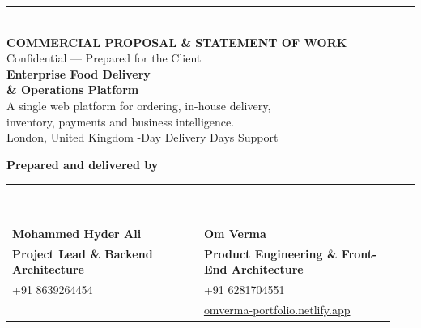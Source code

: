 \documentclass[11pt,a4paper]{article}
\begin{document}
\begin{titlepage}
\thispagestyle{empty}

\begin{tcolorbox}[enhanced,colback=brandnavy,colframe=brandnavy,boxrule=0pt,arc=0pt,
  outer arc=0pt,left=22mm,right=22mm,top=26mm,bottom=16mm,width=\paperwidth,height=118mm,
  valign=top]
  {\color{brandaccent}\rule{34mm}{3pt}}\\[10mm]
  {\color{white}\sffamily\fontsize{12}{14}\selectfont\bfseries COMMERCIAL PROPOSAL \& STATEMENT OF WORK}\\[3mm]
  {\color{brandaccent}\sffamily\fontsize{10}{12}\selectfont Confidential --- Prepared for the Client}\\[13mm]
  {\color{white}\sffamily\fontsize{31}{37}\selectfont\bfseries Enterprise Food Delivery\\[1mm] \& Operations Platform}\\[8mm]
  {\color{white!82}\sffamily\fontsize{13}{18}\selectfont A single web platform for ordering, in-house delivery,\\ inventory, payments and business intelligence.}\\[10mm]
  {\color{white!62}\sffamily\fontsize{10.5}{14}\selectfont London, United Kingdom \quad\textbullet{}-Day Delivery \quad\textbullet{} Days Support}
\end{tcolorbox}

\vspace{9mm}
\hspace{22mm}\begin{minipage}[t][152mm][t]{\dimexpr\paperwidth-44mm\relax}

{\color{brandnavy}\sffamily\bfseries\large Prepared and delivered by}\\[1mm]
{\color{brandline}\rule{\linewidth}{1pt}}\\[3mm]

\begin{tabularx}{\linewidth}{@{}p{0.47\linewidth}p{0.47\linewidth}@{}}
{\sffamily\bfseries\color{brandnavy}\large Mohammed Hyder Ali} &
{\sffamily\bfseries\color{brandnavy}\large Om Verma} \\[-3pt]
{\color{brandaccent}\sffamily\small\bfseries Project Lead \& Backend Architecture} &
{\color{brandaccent}\sffamily\small\bfseries Product Engineering \& Front-End Architecture} \\[-1pt]
{\color{brandgrey}\small +91 8639264454} &
{\color{brandgrey}\small +91 6281704551} \\[-1pt]
&
{\color{brandgrey}\small \href{https://omverma-portfolio.netlify.app/}{omverma-portfolio.netlify.app}} \\
\end{tabularx}


\end{minipage}
\end{titlepage}
\end{document}

